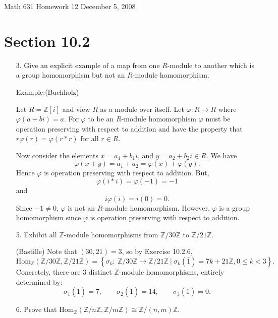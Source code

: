 \documentclass[10pt]{article}
\newcommand{\Z}{\mathbb{Z}}
\newcommand\header{{\sc Math 631 \hfill Homework 12 \hfill December 5, 2008}}
\begin{document}
\header

\section*{Section 10.2}

\begin{itemize}

\item[3.]  Give an explicit example of a map from one $R$-module to another which is a group homomorphism but not an $R$-module homomorphism.

Example:(Buchholz)

Let $R=\Z[i]$ and view $R$ as a module over itself.  Let $\varphi:R\rightarrow R$ where $\varphi(a+bi)=a.$  For $\varphi$ to be an $R$-module homomorphism $\varphi$ must be operation preserving with respect to addition and have the property that $r\varphi(r)=\varphi(r*r)$ for all $r\in R$.    

Now consider the elements $x= a_1 + b_1i$, and $y = a_2 + b_2 i \in R.$  We have 
$$\varphi(x+y)=a_1 + a_2 = \varphi(x)+\varphi(y).$$
Hence $\varphi$ is operation preserving with respect to addition.  But,
$$\varphi(i*i)=\varphi(-1)=-1$$
and 
$$i\varphi(i)=i(0)=0.$$
Since $-1\neq 0$, $\varphi$ is not an $R$-module homomorphism.  However, 
$\varphi$ is a group homomorphism  since $\varphi$ is operation preserving with respect to addition.

\item[5.] Exhibit all $\Z$-module homomorphisms from $\Z/30\Z$ to $\Z/21\Z$.

(Bastille) Note that $(30,21)=3$, so by Exercise 10.2.6,
$$\text{Hom}_{\Z}(\Z/30\Z,\Z/21\Z)=\left\{\sigma_k: \ \Z/30\Z \to \Z/21\Z \ | \ \sigma_k(\bar{1})=7k+21\Z , 0 \leq k <3 \right\}. $$
Concretely, there are 3 distinct $\Z$-module homomorphisms, entirely determined by:
$$ \sigma_1(\bar{1})=\bar{7}, \qquad \sigma_2(\bar{1})=\overline{14}, \qquad \sigma_3(\bar{1})=\bar{0}. $$

\item[6.] Prove that $\text{Hom}_{\Z}(\Z/n\Z,\Z/m\Z) \cong \Z/(n,m)\Z$.


\end{itemize}
\end{document}
